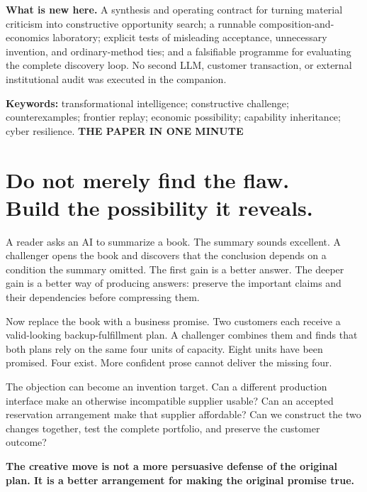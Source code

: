 \documentclass[11pt,a4paper]{article}
\newcommand{\eyebrow}[1]{{\sffamily\small\bfseries\color{Teal}\MakeUppercase{#1}}}
\begin{document}
\begin{scopebox}
\textbf{What is new here.} A synthesis and operating contract for turning material criticism into constructive opportunity search; a runnable composition-and-economics laboratory; explicit tests of misleading acceptance, unnecessary invention, and ordinary-method ties; and a falsifiable programme for evaluating the complete discovery loop. No second LLM, customer transaction, or external institutional audit was executed in the companion.
\end{scopebox}
{\small\textbf{Keywords:} transformational intelligence; constructive challenge; counterexamples; frontier replay; economic possibility; capability inheritance; cyber resilience.}
\newpage
\eyebrow{The paper in one minute}
\section*{Do not merely find the flaw.\\Build the possibility it reveals.}
A reader asks an AI to summarize a book. The summary sounds excellent. A challenger opens the book and discovers that the conclusion depends on a condition the summary omitted. The first gain is a better answer. The deeper gain is a better way of producing answers: preserve the important claims and their dependencies before compressing them.

Now replace the book with a business promise. Two customers each receive a valid-looking backup-fulfillment plan. A challenger combines them and finds that both plans rely on the same four units of capacity. Eight units have been promised. Four exist. More confident prose cannot deliver the missing four.

The objection can become an invention target. Can a different production interface make an otherwise incompatible supplier usable? Can an accepted reservation arrangement make that supplier affordable? Can we construct the two changes together, test the complete portfolio, and preserve the customer outcome?

\begin{insight}
\textbf{The creative move is not a more persuasive defense of the original plan. It is a better arrangement for making the original promise true.}
\end{insight}
\end{document}
